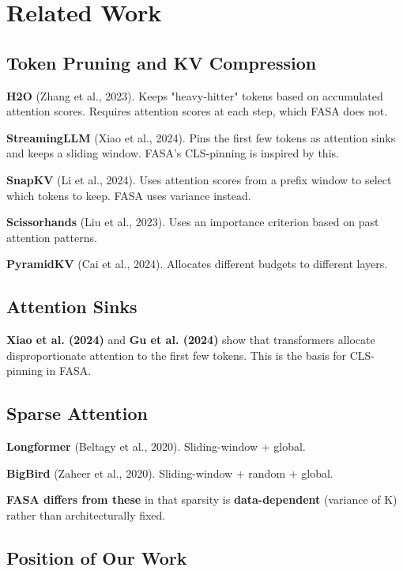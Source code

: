 
\section{Related Work}

\subsection{Token Pruning and KV Compression}

\textbf{H2O} (Zhang et al., 2023). Keeps "heavy-hitter" tokens based on 
accumulated attention scores. Requires attention scores at each step, which 
FASA does not.

\textbf{StreamingLLM} (Xiao et al., 2024). Pins the first few tokens as attention 
sinks and keeps a sliding window. FASA's CLS-pinning is inspired by this.

\textbf{SnapKV} (Li et al., 2024). Uses attention scores from a prefix window to 
select which tokens to keep. FASA uses variance instead.

\textbf{Scissorhands} (Liu et al., 2023). Uses an importance criterion based on 
past attention patterns.

\textbf{PyramidKV} (Cai et al., 2024). Allocates different budgets to different 
layers.

\subsection{Attention Sinks}

\textbf{Xiao et al. (2024)} and \textbf{Gu et al. (2024)} show that transformers 
allocate disproportionate attention to the first few tokens. This is the 
basis for CLS-pinning in FASA.

\subsection{Sparse Attention}

\textbf{Longformer} (Beltagy et al., 2020). Sliding-window + global.

\textbf{BigBird} (Zaheer et al., 2020). Sliding-window + random + global.

\textbf{FASA differs from these} in that sparsity is \textbf{data-dependent} 
(variance of K) rather than architecturally fixed.

\subsection{Position of Our Work}

